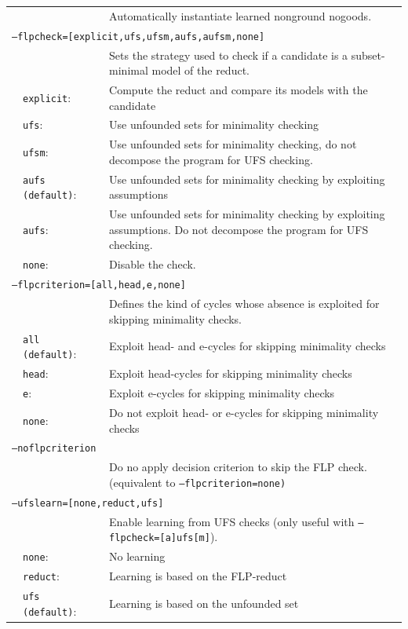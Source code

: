 \documentclass[a4paper, titlepage]{article}
\begin{document}
\begin{center}
\begin{longtable}{p{0.7cm}  p{2.2cm} p{0.3cm} p{6.3cm}  }
& & &Automatically instantiate learned nonground nogoods.\\
\multicolumn{4}{l}{\texttt{--flpcheck=[explicit,ufs,ufsm,aufs,aufsm,none]}}\\
& & &Sets the strategy used to check if a candidate is a subset-minimal model of the reduct.\\
&\texttt{explicit}:&&Compute the reduct and compare its models with the candidate\\
&\texttt{ufs}:&&Use unfounded sets for minimality checking
\\
&\texttt{ufsm}:&&Use unfounded sets for minimality checking, do not decompose the program for UFS checking.\\
&\texttt{aufs (default)}:&&Use unfounded sets for minimality checking by exploiting assumptions\\
&\texttt{aufs}:&&Use unfounded sets for minimality checking by exploiting assumptions. Do not decompose the program for UFS checking.\\
&\texttt{none}:&&Disable the check.\\
\multicolumn{4}{l}{\texttt{--flpcriterion=[all,head,e,none]}}\\
& & & Defines the kind of cycles whose absence is exploited for skipping minimality checks.\\
&\texttt{all (default)}:&&Exploit head- and e-cycles for skipping minimality checks\\
&\texttt{head}:&& Exploit head-cycles for skipping minimality checks\\
&\texttt{e}:&&Exploit e-cycles for skipping minimality checks\\
&\texttt{none}:&& Do not exploit head- or e-cycles for skipping minimality checks\\
\multicolumn{4}{l}{\texttt{--noflpcriterion}}\\
& & & Do no apply decision criterion to skip the FLP check. (equivalent to \texttt{--flpcriterion=none)}\\
\multicolumn{4}{l}{\texttt{--ufslearn=[none,reduct,ufs]}}\\
& & & Enable learning from UFS checks (only useful with \texttt{--flpcheck=[a]ufs[m]}).\\
&\texttt{none}:&&No learning\\
&\texttt{reduct}:&&Learning is based on the FLP-reduct\\
&\texttt{ufs (default)}:&&Learning is based on the unfounded set\\

\end{longtable}
\end{center}
\end{document}

